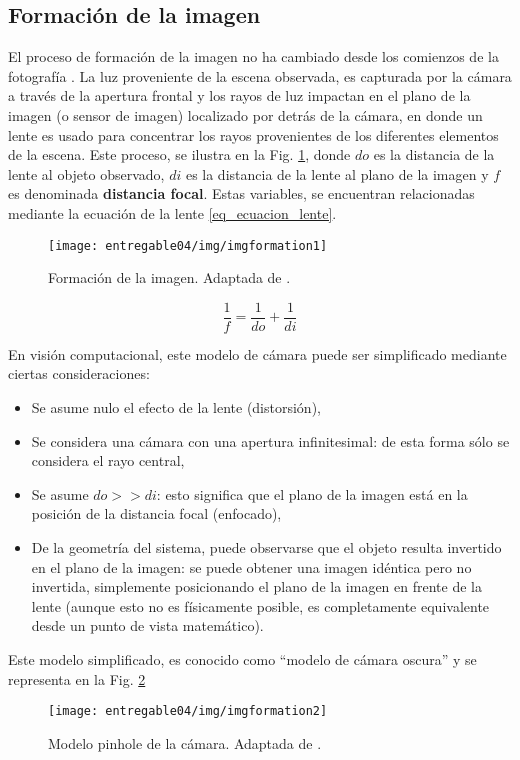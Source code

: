 \documentclass[a4paper,11pt,spanish]{article}
\begin{document}
\subsection{Formación de la imagen}
\label{subsubsection_formacion_imagen}
El proceso de formación de la imagen no ha cambiado desde los comienzos de la fotografía \cite{citeulike:9456628}. La luz proveniente de la escena observada, es capturada por la cámara a través de la apertura frontal y los rayos de luz impactan en el plano de la imagen (o sensor de imagen) localizado por detrás de la cámara, en donde un lente es usado para concentrar los rayos provenientes de los diferentes elementos de la escena. Este proceso, se ilustra en la Fig. \ref{figura_image_formation_1}, donde $do$ es la distancia de la lente al objeto observado, $di$ es la distancia de la lente al plano de la imagen y $f$ es denominada \textbf{distancia focal}. Estas variables, se encuentran relacionadas mediante la ecuación de la lente \eqref{eq_ecuacion_lente}.

\begin{figure}[tbhp]
\centerline{\texttt{[image: entregable04/img/imgformation1]}}
\caption{Formación de la imagen. Adaptada de \cite{citeulike:9456628}. }
\label{figura_image_formation_1}
\end{figure}

\begin{equation}
 \frac{1}{f}=\frac{1}{do}+\frac{1}{di}
\label{eq_ecuacion_lente}
\end{equation}

En visión computacional, este modelo de cámara puede ser simplificado mediante ciertas consideraciones:
\begin{itemize}
 \item Se asume nulo el efecto de la lente (distorsión),
 \item Se considera una cámara con una apertura infinitesimal: de esta forma sólo se considera el rayo central,
 \item Se asume $do>>di$: esto significa que el plano de la imagen está en la posición de la distancia focal (enfocado),
 \item De la geometría del sistema, puede observarse que el objeto resulta invertido en el plano de la imagen: se puede obtener una imagen idéntica pero no invertida, simplemente posicionando el plano de la imagen en frente de la lente (aunque esto no es físicamente posible, es completamente equivalente desde un punto de vista matemático).
\end{itemize}
Este modelo simplificado, es conocido como ``modelo de cámara oscura'' y se representa en la Fig. \ref{figura_image_formation_2}
\begin{figure}[tbhp]
\centerline{\texttt{[image: entregable04/img/imgformation2]}}
\caption{Modelo pin\-hole de la cámara. Adaptada de \cite{citeulike:9456628}.}
\label{figura_image_formation_2}
\end{figure}
\end{document}
